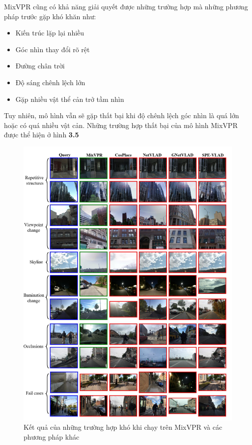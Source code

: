 MixVPR cũng có khả năng giải quyết được những trường hợp mà những phương pháp trước gặp khó khăn như:
\begin{itemize}
  \item Kiến trúc lặp lại nhiều
  \item Góc nhìn thay đổi rõ rệt
  \item Đường chân trời
  \item Độ sáng chênh lệch lớn
  \item Gặp nhiều vật thể cản trở tầm nhìn
\end{itemize}
Tuy nhiên, mô hình vẫn sẽ gặp thất bại khi độ chênh lệch góc nhìn là quá lớn hoặc có quá nhiều vật cản. Những trường hợp thất bại của mô hình MixVPR được thể hiện ở hình \textbf{3.5}

\begin{figure}
  \centering
  \includegraphics[width=\textwidth]{pics/Proposal/fail.png}
  \caption{Kết quả của những trường hợp khó khi chạy trên MixVPR và các phương pháp khác \cite{alibey2023mixvpr}}
\end{figure}

